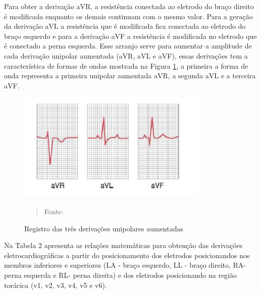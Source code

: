 \documentclass[12pt, a4paper]{article}
\begin{document}
Para obter a derivação aVR, a resistência conectada ao eletrodo do braço direito é modificada enquanto os demais continuam com o mesmo valor. Para a geração da derivação aVL a resistência que é modificada fica conectada ao eletrodo do braço esquerdo e para a derivação aVF a resistência é modificada no eletrodo que é conectado a perna esquerda. Esse arranjo serve para aumentar a amplitude de cada derivação unipolar aumentada (aVR, aVL e aVF), essas derivações tem a característica de formas de ondas mostrada na Figura \ref{fig:aba}, a primeira a forma de onda representa a primeira unipolar aumentada aVR, a segunda aVL e a terceira aVF.

\begin{figure}[!htpb]
\begin{center}
			\caption{Registro das três derivações unipolares aumentadas}
			\includegraphics[width=.5\textwidth]{Figuras/tres.PNG}
            \vspace*{\fill} 
            \begin{quote} 
            \centering 
            Fonte: \cite{guyton}
            \end{quote}
            \vspace*{\fill}
			\label{fig:aba}
\end{center}
\end{figure}

Na Tabela 2 apresenta as relações matemáticas para obtenção das derivações eletrocardiográficas a partir do posicionamento dos eletrodos  posicionandos nos membros inferiores e superiores (LA - braço esquerdo, LL - braço direito, RA- perna esquerda e RL- perna direita) e dos eletrodos posicionando na região torácica (v1, v2, v3, v4, v5 e v6).  
\end{document}
